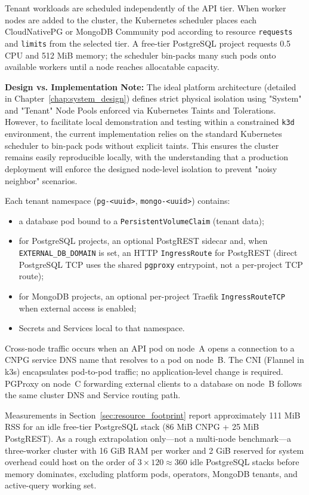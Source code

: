 Tenant workloads are scheduled independently of the API tier. When worker nodes are added to the cluster, the Kubernetes scheduler places each CloudNativePG or MongoDB Community pod according to resource \texttt{requests} and \texttt{limits} from the selected tier. A free-tier PostgreSQL project requests 0.5 CPU and 512 MiB memory; the scheduler bin-packs many such pods onto available workers until a node reaches allocatable capacity.

\textbf{Design vs. Implementation Note:} The ideal platform architecture (detailed in Chapter~\ref{chap:system_design}) defines strict physical isolation using "System" and "Tenant" Node Pools enforced via Kubernetes Taints and Tolerations. However, to facilitate local demonstration and testing within a constrained \texttt{k3d} environment, the current implementation relies on the standard Kubernetes scheduler to bin-pack pods without explicit taints. This ensures the cluster remains easily reproducible locally, with the understanding that a production deployment will enforce the designed node-level isolation to prevent "noisy neighbor" scenarios.

Each tenant namespace (\texttt{pg-<uuid>}, \texttt{mongo-<uuid>}) contains:

\begin{itemize}
    \item a database pod bound to a \texttt{PersistentVolumeClaim} (tenant data);
    \item for PostgreSQL projects, an optional PostgREST sidecar and, when \texttt{EXTERNAL\_DB\_DOMAIN} is set, an HTTP \texttt{IngressRoute} for PostgREST (direct PostgreSQL TCP uses the shared \texttt{pgproxy} entrypoint, not a per-project TCP route);
    \item for MongoDB projects, an optional per-project Traefik \texttt{IngressRouteTCP} when external access is enabled;
    \item Secrets and Services local to that namespace.
\end{itemize}

Cross-node traffic occurs when an API pod on node~A opens a connection to a CNPG service DNS name that resolves to a pod on node~B. The CNI (Flannel in k3s) encapsulates pod-to-pod traffic; no application-level change is required. PGProxy on node~C forwarding external clients to a database on node~B follows the same cluster DNS and Service routing path.

Measurements in Section~\ref{sec:resource_footprint} report approximately 111 MiB RSS for an idle free-tier PostgreSQL stack (86 MiB CNPG + 25 MiB PostgREST). As a rough extrapolation only---not a multi-node benchmark---a three-worker cluster with 16 GiB RAM per worker and 2 GiB reserved for system overhead could host on the order of $3 \times 120 \approx 360$ idle PostgreSQL stacks before memory dominates, excluding platform pods, operators, MongoDB tenants, and active-query working set.

